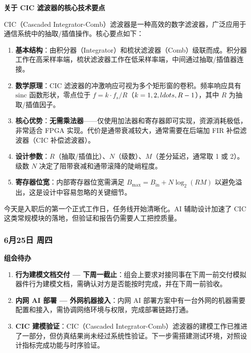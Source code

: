 \begin{personalnote}
\textbf{关于 CIC 滤波器的核心技术要点}

CIC（Cascaded Integrator-Comb）滤波器是一种高效的数字滤波器，广泛应用于通信系统中的抽取/插值操作。核心要点如下：

\begin{enumerate}
  \item \textbf{基本结构}：由积分器（Integrator）和梳状滤波器（Comb）级联而成。积分器工作在高采样率端，梳状滤波器工作在低采样率端，中间通过抽取/插值器连接。
  \item \textbf{数学原理}：CIC 滤波器的冲激响应可视为多个矩形窗的卷积。频率响应具有 $\mathrm{sinc}$ 函数形状，零点位于 $f = k \cdot f_s / R$（$k=1,2,\\ldots,R-1$），其中 $R$ 为抽取/插值因子。
  \item \textbf{核心优势}：\textbf{无需乘法器}——仅使用加法器和寄存器即可实现，资源消耗极低，非常适合 FPGA 实现。代价是通带衰减较大，通常需要在后端加 FIR 补偿滤波器（CIC 补偿滤波器）。
  \item \textbf{设计参数}：$R$（抽取/插值比）、$N$（级数）、$M$（差分延迟，通常取 1 或 2）。级数 $N$ 决定了阻带衰减和通带滚降的陡峭程度。
  \item \textbf{寄存器位宽}：内部寄存器位宽需满足 $B_{\text{max}} = B_{\text{in}} + N \log_2 (RM)$ 以避免溢出，这是设计中容易忽略的关键细节。
\end{enumerate}

今天是入职后的第一个正式工作日，任务线开始清晰化。AI 辅助设计加速了 CIC 这类常规模块的落地，但验证和报告仍需要人工把控质量。
\end{personalnote}

\subsubsection{6月25日 周四}

\begin{taskbox}
\textbf{组会待办}
\begin{enumerate}
  \item \textbf{行为建模文档交付 — 下周一截止}：组会上要求对接同事在下周一前交付模拟器件行为建模文档，需确认对方是否能按时完成，并在下周一前验收。
  \item \textbf{内网 AI 部署 — 外网机器接入}：内网 AI 部署方案中有一台外网的机器需要配置和接入，需协调网络环境与权限，完成部署链路打通。
  \item \textbf{CIC 建模验证}：CIC（Cascaded Integrator-Comb）滤波器的建模工作已推进了一部分，但仿真结果尚未经过系统性验证。下一步需搭建测试环境，对照设计指标完成功能与时序验证。
\end{enumerate}
\end{taskbox}


